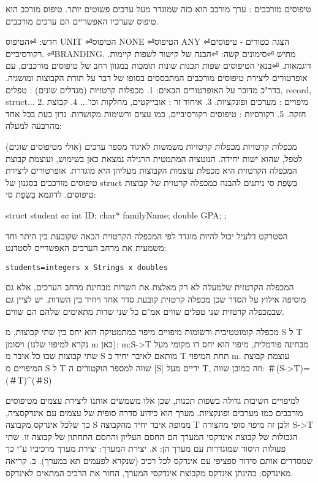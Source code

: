 \begin{טבלא}[!htbp]
      טיפוסים מורכבים :
      ערך מורכב הוא כזה שמוגדר מעל ערכים פשוטים יותר. טיפוס מורכב הוא טיפוס שערכיו האפשריים הם ערכים מורכבים.

      חדש:
⏎הטיפוס UNIT
⏎הטיפוס NONE
⏎הטיפוס ANY
⏎הצגה כטורים - טיפוסים רקורסיביים.
⏎BRANDING.
      מתיש
⏎סימונים
      קשה:
⏎הבנה של קישור לשפות קיימות. דוגמאות.
⏎בנאי הטיפוסים
      שפות תכנות שונות תומכות במגוון רחב של טיפוסים מורכבים, עם אופרטורים ליצירת טיפוסים מורכבים המתבססים בסופו של דבר על תורת הקבוצות ומושגיה.
      בדר"כ מדובר על האופרטורים הבאים:
      1. מכפלות קרטזיות (מגדלים שונים) : טפלים, record, struct...
      2. מיפויים : מערכים ופונקציות.
      3. איחוד זר : אובייקטים, מחלקות וכו'...
      4. קבוצת חזקה.
      5. רקורסיות : טיפוסים רקורסיביים, כמו עצים ורשימות מקושרות.
      נדון כעת בכל אחד מהרבעה למעלה:

      מכפלות קרטזיות
      מכפלות קרטזיות משמשות לאיגוד מספר ערכים (אולי מטיפוסים שונים) לטפל, שהוא ישות יחידה.
      הנוטציה המתמטית הרגילה נמצאת כאן בשימוש, ועוצמת קבוצת המכפלה הקרטזית היא מכפלת עוצמות הקבוצות מעליהן היא מוגדרת. אופרטורים ליצירת טיפוסים מורכבים בסגנון של struct בִּשְׂפַת סי ניתנים להבנה כמכפלה קרטזית של קבוצות טיפוסים. לדוגמא בִּשְׂפַת סי:

\begin{CPP}
struct student {¢¢
          int ID;
        char* familyName;
        double GPA;
};
\end{CPP}

      הסטרקט דלעיל יכול להיות מוגדר לפי המכפלה הקרטזית הבאה שקובעת בין היתר וחד משמעית את מרחב הערכים האפשריים לסטדנט:
\begin{verbatim}
students=integers x Strings x doubles
\end{verbatim}
      המכפלה הקרטזית שלמעלה לא רק מאלצת את השדות מבחינת מרחב הערכים, אלא גם מוסיפה אילוץ על הסדר שכן מכפלה קרטזית קובעת סדר אחד ויחיד בין השדות.
      יש לציין גם שבמכפלה קרטזית שני טפלים שווים אמ"ם כל שני שדות מתאימים שלהם הם שווים.

      מכפלה קומוטטיבית ורשומות
      מיפויים
      מיפוי במתמטיקה הוא יחס בין שתי קבוצות, מ S ל T ויסומן (נקרא למיפוי שלנו m כאן):
      m:S->T
      מבחינה פורמלית, מיפוי הוא יחס דו מקומי מעל שתי קבוצות שבו כל איבר מ S מותאם לאיבר יחיד ב T תחת המיפוי m.
      עוצמת קבוצת המיפויים מ S ל T שווה למספר הוקטורים ה |S| יריים מעל T, וזה כמובן שווה:
        ＃(S->T)=(＃T)^(＃S)

      למיפויים חשיבות גדולה בשפות תכנות, שכן אלו משמשים אותנו ליצירת עצמים מטיפוסים
      מורכבים כמו מערכים ופונקציות. מערך הוא כידוע סדרה סופית של עצמים עם אינדקסציה,
      כך שלכל אינדקס מקבוצה S ממופה איבר יחיד מהקבוצה T ולכן זה מיפוי סופי מהצורה
      S->T
      הגבולות של קבוצת אינדקסי המערך הם החסם העליון והחסם התחתון של קבוצה זו. שתי
      פעולות היסוד שמוגדרות עם מערך הן: א. יצירת המערך: יצירת מערך מרכיביו ע"י כך
      שמסדרים אותם סידור ספציפי עם אינדקס לכל רכיב (שנקרא לפעמים תא במערך).
      ב. קריאה מאינדקס: בהינתן אינדקס מקבוצת אינדקסי המערך, החזר את הרכיב המתאים לאינדקס.


\end{טבלא}
